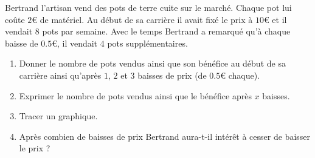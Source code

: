 
Bertrand l'artisan vend des pots de terre cuite sur le marché. Chaque pot lui coûte \( 2\)€ de matériel. Au début de sa carrière il avait fixé le prix à \( 10\)€ et il vendait \( 8\) pots par semaine. Avec le temps Bertrand a remarqué qu'à chaque baisse de \( 0.5\)€, il vendait \( 4\) pots supplémentaires.

\begin{enumerate}
    \item
        Donner le nombre de pots vendus ainsi que son bénéfice au début de sa carrière ainsi qu'après \( 1\), \( 2\) et \( 3\) baisses de prix (de \( 0.5\)€ chaque).
    \item
        Exprimer le nombre de pots vendus ainsi que le bénéfice après \( x\) baisses.
    \item
        Tracer un graphique.
    \item
        Après combien de baisses de prix Bertrand aura-t-il intérêt à cesser de baisser le prix ?
\end{enumerate}
